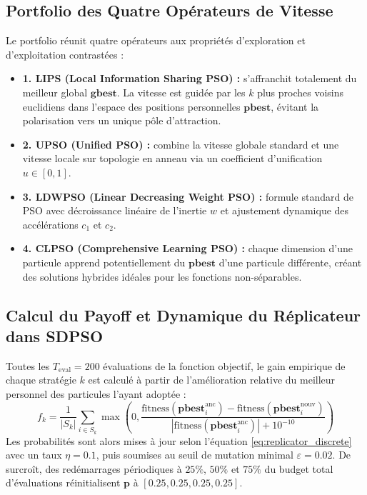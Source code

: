 \subsection{Portfolio des Quatre Opérateurs de Vitesse}
Le portfolio réunit quatre opérateurs aux propriétés d'exploration et d'exploitation contrastées :
\begin{itemize}[label=\textbullet]
    \item \textbf{1. LIPS (Local Information Sharing PSO) :} s'affranchit totalement du meilleur global $\mathbf{gbest}$. La vitesse est guidée par les $k$ plus proches voisins euclidiens dans l'espace des positions personnelles $\mathbf{pbest}$, évitant la polarisation vers un unique pôle d'attraction.
    \item \textbf{2. UPSO (Unified PSO) :} combine la vitesse globale standard et une vitesse locale sur topologie en anneau via un coefficient d'unification $u \in [0, 1]$.
    \item \textbf{3. LDWPSO (Linear Decreasing Weight PSO) :} formule standard de PSO avec décroissance linéaire de l'inertie $w$ et ajustement dynamique des accélérations $c_1$ et $c_2$.
    \item \textbf{4. CLPSO (Comprehensive Learning PSO) :} chaque dimension d'une particule apprend potentiellement du $\mathbf{pbest}$ d'une particule différente, créant des solutions hybrides idéales pour les fonctions non-séparables.
\end{itemize}

\subsection{Calcul du Payoff et Dynamique du Réplicateur dans SDPSO}
Toutes les $T_{\text{eval}} = 200$ évaluations de la fonction objectif, le gain empirique de chaque stratégie $k$ est calculé à partir de l'amélioration relative du meilleur personnel des particules l'ayant adoptée :
\begin{equation}
    f_k = \frac{1}{|S_k|} \sum_{i \in S_k} \max\left(0, \frac{\text{fitness}(\mathbf{pbest}_i^{\text{anc}}) - \text{fitness}(\mathbf{pbest}_i^{\text{nouv}})}{|\text{fitness}(\mathbf{pbest}_i^{\text{anc}})| + 10^{-10}}\right)
\end{equation}
Les probabilités sont alors mises à jour selon l'équation \eqref{eq:replicator_discrete} avec un taux $\eta = 0.1$, puis soumises au seuil de mutation minimal $\varepsilon = 0.02$. De surcroît, des redémarrages périodiques à $25\%$, $50\%$ et $75\%$ du budget total d'évaluations réinitialisent $\mathbf{p}$ à $[0.25, 0.25, 0.25, 0.25]$.

